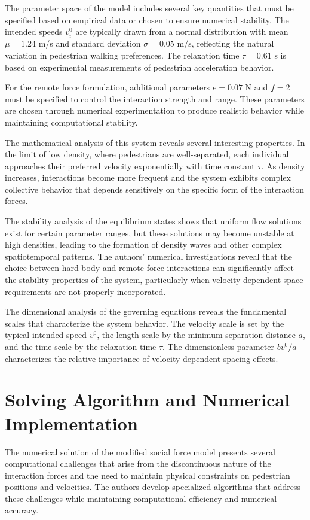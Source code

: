 \documentclass[12pt,a4paper]{article}
\begin{document}
The parameter space of the model includes several key quantities that must be specified based on empirical data or chosen to ensure numerical stability. The intended speeds $v_i^0$ are typically drawn from a normal distribution with mean $\mu = 1.24$ m/s and standard deviation $\sigma = 0.05$ m/s, reflecting the natural variation in pedestrian walking preferences. The relaxation time $\tau = 0.61$ s is based on experimental measurements of pedestrian acceleration behavior.

For the remote force formulation, additional parameters $e = 0.07$ N and $f = 2$ must be specified to control the interaction strength and range. These parameters are chosen through numerical experimentation to produce realistic behavior while maintaining computational stability.

The mathematical analysis of this system reveals several interesting properties. In the limit of low density, where pedestrians are well-separated, each individual approaches their preferred velocity exponentially with time constant $\tau$. As density increases, interactions become more frequent and the system exhibits complex collective behavior that depends sensitively on the specific form of the interaction forces.

The stability analysis of the equilibrium states shows that uniform flow solutions exist for certain parameter ranges, but these solutions may become unstable at high densities, leading to the formation of density waves and other complex spatiotemporal patterns. The authors' numerical investigations reveal that the choice between hard body and remote force interactions can significantly affect the stability properties of the system, particularly when velocity-dependent space requirements are not properly incorporated.

The dimensional analysis of the governing equations reveals the fundamental scales that characterize the system behavior. The velocity scale is set by the typical intended speed $v^0$, the length scale by the minimum separation distance $a$, and the time scale by the relaxation time $\tau$. The dimensionless parameter $b v^0 / a$ characterizes the relative importance of velocity-dependent spacing effects.

\section{Solving Algorithm and Numerical Implementation}

The numerical solution of the modified social force model presents several computational challenges that arise from the discontinuous nature of the interaction forces and the need to maintain physical constraints on pedestrian positions and velocities. The authors develop specialized algorithms that address these challenges while maintaining computational efficiency and numerical accuracy.
\end{document}
